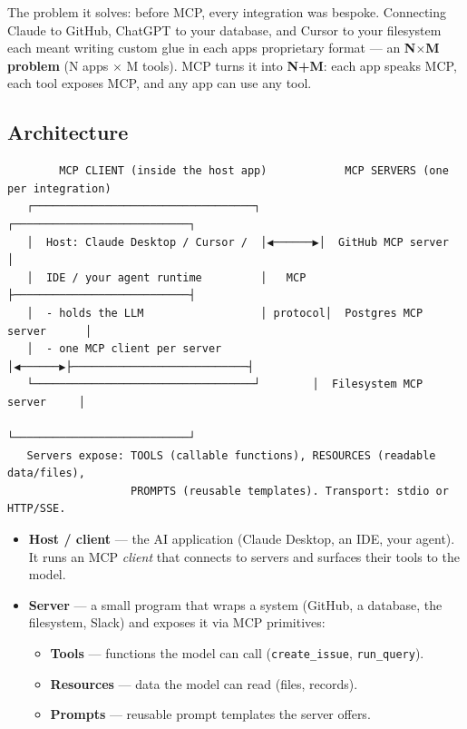\documentclass[11pt]{article}
\providecommand{\tightlist}{\setlength{\itemsep}{1pt}\setlength{\parskip}{0pt}}
\begin{document}
The problem it solves: before MCP, every integration was bespoke. Connecting Claude to GitHub, ChatGPT to your database, and Cursor to your filesystem each meant writing custom glue in each app\textquotesingle s proprietary format --- an \textbf{N\(\times\)M problem} (N apps \(\times\) M tools). MCP turns it into \textbf{N+M}: each app speaks MCP, each tool exposes MCP, and any app can use any tool.

\subsection{Architecture}\label{architecture}

\setcodelang{}

\begin{verbatim}
        MCP CLIENT (inside the host app)            MCP SERVERS (one per integration)
   ┌──────────────────────────────────┐        ┌───────────────────────────┐
   │  Host: Claude Desktop / Cursor /  │◀──────▶│  GitHub MCP server        │
   │  IDE / your agent runtime         │   MCP  ├───────────────────────────┤
   │  - holds the LLM                  │ protocol│  Postgres MCP server      │
   │  - one MCP client per server      │◀──────▶├───────────────────────────┤
   └──────────────────────────────────┘        │  Filesystem MCP server     │
                                                └───────────────────────────┘
   Servers expose: TOOLS (callable functions), RESOURCES (readable data/files),
                   PROMPTS (reusable templates). Transport: stdio or HTTP/SSE.
\end{verbatim}

\begin{itemize}
\tightlist
\item
  \textbf{Host / client} --- the AI application (Claude Desktop, an IDE, your agent). It runs an MCP \emph{client} that connects to servers and surfaces their tools to the model.
\item
  \textbf{Server} --- a small program that wraps a system (GitHub, a database, the filesystem, Slack) and exposes it via MCP primitives:

  \begin{itemize}
  \tightlist
  \item
    \textbf{Tools} --- functions the model can call (\texttt{create\_issue}, \texttt{run\_query}).
  \item
    \textbf{Resources} --- data the model can read (files, records).
  \item
    \textbf{Prompts} --- reusable prompt templates the server offers.
  \end{itemize}
\end{itemize}
\end{document}
